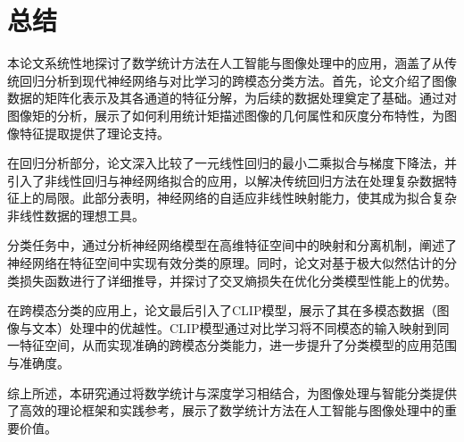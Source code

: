 \documentclass[
    report,     %
    oneside,    %
    UTF8,       %
    zihao=-4    %
]{config} %
\begin{document}

\chapter{总结}

本论文系统性地探讨了数学统计方法在人工智能与图像处理中的应用，涵盖了从传统回归分析到现代神经网络与对比学习的跨模态分类方法。首先，论文介绍了图像数据的矩阵化表示及其各通道的特征分解，为后续的数据处理奠定了基础。通过对图像矩的分析，展示了如何利用统计矩描述图像的几何属性和灰度分布特性，为图像特征提取提供了理论支持。

在回归分析部分，论文深入比较了一元线性回归的最小二乘拟合与梯度下降法，并引入了非线性回归与神经网络拟合的应用，以解决传统回归方法在处理复杂数据特征上的局限。此部分表明，神经网络的自适应非线性映射能力，使其成为拟合复杂非线性数据的理想工具。

分类任务中，通过分析神经网络模型在高维特征空间中的映射和分离机制，阐述了神经网络在特征空间中实现有效分类的原理。同时，论文对基于极大似然估计的分类损失函数进行了详细推导，并探讨了交叉熵损失在优化分类模型性能上的优势。

在跨模态分类的应用上，论文最后引入了CLIP模型，展示了其在多模态数据（图像与文本）处理中的优越性。CLIP模型通过对比学习将不同模态的输入映射到同一特征空间，从而实现准确的跨模态分类能力，进一步提升了分类模型的应用范围与准确度。

综上所述，本研究通过将数学统计与深度学习相结合，为图像处理与智能分类提供了高效的理论框架和实践参考，展示了数学统计方法在人工智能与图像处理中的重要价值。






\begin{references}
\end{references}





\end{document}
